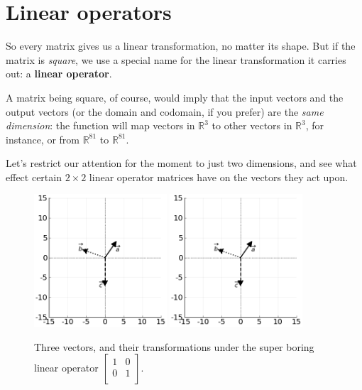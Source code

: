 \section{Linear operators}

\label{linearOps}

So every matrix gives us a linear transformation, no matter its shape. But if
the matrix is \textit{square}, we use a special name for the linear
transformation it carries out: a \textbf{linear operator}.

A matrix being square, of course, would imply that the input vectors and the
output vectors (or the domain and codomain, if you prefer) are the \textit{same
dimension}: the function will map vectors in $\mathbb{R}^3$ to other vectors in
$\mathbb{R}^3$, for instance, or from $\mathbb{R}^{81}$ to $\mathbb{R}^{81}$.

Let's restrict our attention for the moment to just two dimensions, and see
what effect certain $2\times 2$ linear operator matrices have on the vectors
they act upon.

\begin{figure}[hb]
\centering
\includegraphics[width=0.44\textwidth]{preoperators.png}
\includegraphics[width=0.44\textwidth]{preoperators.png}
\caption[.]{Three vectors, and their transformations under the super boring
linear operator {\scriptsize $\begin{bmatrix} 1 & 0 \\ 0 & 1 \\
\end{bmatrix}$.}}
\label{fig:identityOp}
\end{figure}

